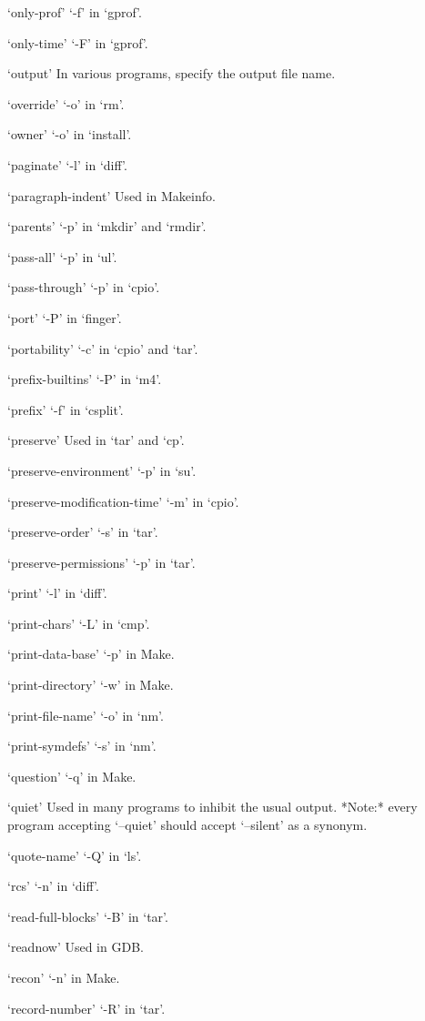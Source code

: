 `only-prof'
     `-f' in `gprof'.

`only-time'
     `-F' in `gprof'.

`output'
     In various programs, specify the output file name.

`override'
     `-o' in `rm'.

`owner'
     `-o' in `install'.

`paginate'
     `-l' in `diff'.

`paragraph-indent'
     Used in Makeinfo.

`parents'
     `-p' in `mkdir' and `rmdir'.

`pass-all'
     `-p' in `ul'.

`pass-through'
     `-p' in `cpio'.

`port'
     `-P' in `finger'.

`portability'
     `-c' in `cpio' and `tar'.

`prefix-builtins'
     `-P' in `m4'.

`prefix'
     `-f' in `csplit'.

`preserve'
     Used in `tar' and `cp'.

`preserve-environment'
     `-p' in `su'.

`preserve-modification-time'
     `-m' in `cpio'.

`preserve-order'
     `-s' in `tar'.

`preserve-permissions'
     `-p' in `tar'.

`print'
     `-l' in `diff'.

`print-chars'
     `-L' in `cmp'.

`print-data-base'
     `-p' in Make.

`print-directory'
     `-w' in Make.

`print-file-name'
     `-o' in `nm'.

`print-symdefs'
     `-s' in `nm'.

`question'
     `-q' in Make.

`quiet'
     Used in many programs to inhibit the usual output.  *Note:* every
     program accepting `--quiet' should accept `--silent' as a synonym.

`quote-name'
     `-Q' in `ls'.

`rcs'
     `-n' in `diff'.

`read-full-blocks'
     `-B' in `tar'.

`readnow'
     Used in GDB.

`recon'
     `-n' in Make.

`record-number'
     `-R' in `tar'.

